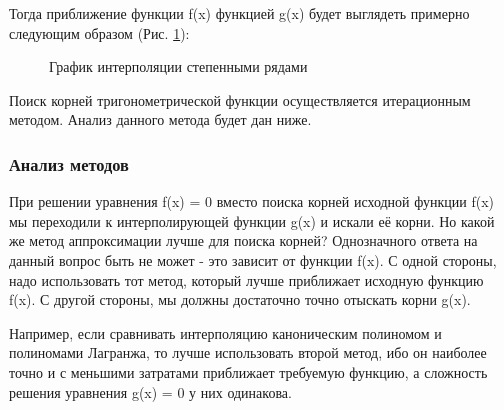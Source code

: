 \documentclass{article}
\begin{document}
				Тогда приближение функции f(x) функцией g(x) будет выглядеть примерно следующим образом (Рис. \ref{fig:dix5}):
				\begin{figure}[H]
					\caption{График интерполяции степенными рядами}
					\label{fig:dix5}
				\end{figure}
				
				Поиск корней тригонометрической функции осуществляется итерационным методом. Анализ данного метода будет дан ниже.
				
			\subsubsection{Анализ методов}
			
				При решении уравнения f(x) = 0 вместо поиска корней исходной функции f(x) мы переходили к интерполирующей функции g(x) и искали её корни. Но какой же метод аппроксимации лучше для поиска корней?
Однозначного ответа на данный вопрос быть не может - это зависит от функции f(x). С одной стороны, надо использовать тот метод, который лучше приближает исходную функцию f(x). С другой стороны, мы должны достаточно точно отыскать корни g(x).

			Например, если сравнивать интерполяцию каноническим полиномом и полиномами Лагранжа, то лучше использовать второй метод, ибо он наиболее точно и с меньшими затратами приближает требуемую функцию, а сложность решения уравнения g(x) = 0 у них одинакова.
\end{document}
